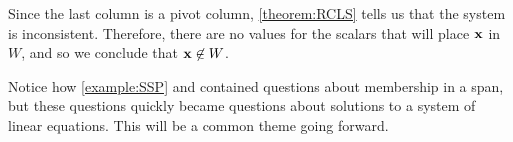 \documentclass{ximera}
\begin{document}
\begin{example}[A subspace of $M_{32}$]
  \begin{feedback}[correct]
    Since the last column is a pivot column, \ref{theorem:RCLS} tells
    us that the system is inconsistent.  Therefore, there are no
    values for the scalars that will place $\mathbf{x}$ in $W$, and so
    we conclude that $\mathbf{x}\not\in W$.
  \end{feedback}
\end{example}

Notice how \ref{example:SSP} and contained questions about membership
in a span, but these questions quickly became questions about
solutions to a system of linear equations.  This will be a common
theme going forward.
\end{document}
